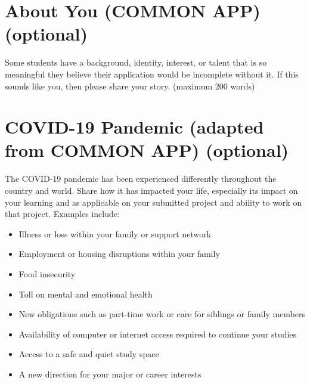 \documentclass[little]{basic}
\begin{document}
\section{About You (COMMON APP) (optional)}
\label{sec:orgb28081b}
Some students have a background, identity, interest, or talent that is so meaningful they believe their application would be incomplete without it. If this sounds like you, then please share your story. (maximum 200 words)

\section{COVID-19 Pandemic (adapted from COMMON APP) (optional)}
\label{sec:org89440bb}

The COVID-19 pandemic has been experienced differently throughout the country and world. Share how it has impacted your life, especially its impact on your learning and as applicable on your submitted project and ability to work on that project. Examples include:
\begin{itemize}
\item Illness or loss within your family or support network
\item Employment or housing disruptions within your family
\item Food insecurity
\item Toll on mental and emotional health
\item New obligations such as part-time work or care for siblings or family members
\item Availability of computer or internet access required to continue your studies
\item Access to a safe and quiet study space
\item A new direction for your major or career interests
\end{itemize}
\end{document}
